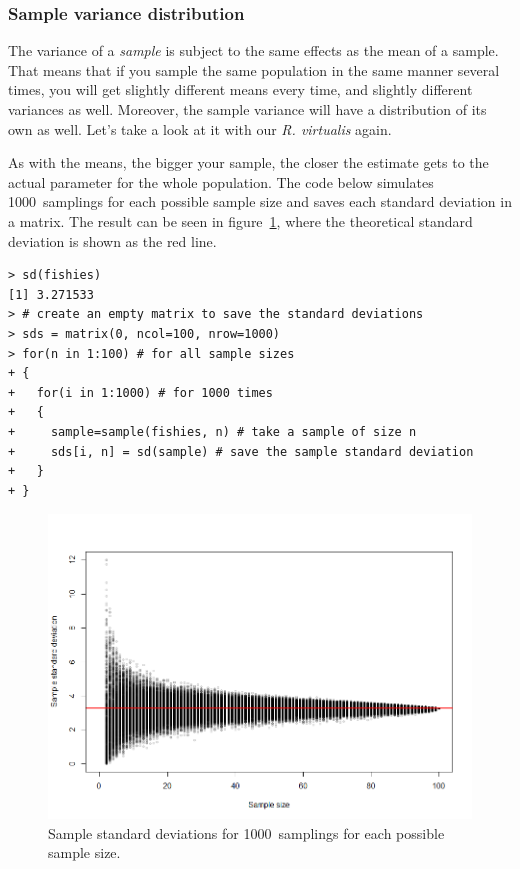 \documentclass{report}
\newcommand{\species}[1]{\textit{#1}}
\begin{document}
			\subsubsection{Sample variance distribution}
			
			The variance of a \emph{sample} is subject to the same effects as the mean of a sample. That means that if you sample the same population in the same manner several times, you will get slightly different means every time, and slightly different variances as well. Moreover, the sample variance will have a distribution of its own as well. Let's take a look at it with our \species{R. virtualis} again.
			
			As with the means, the bigger your sample, the closer the estimate gets to the actual parameter for the whole population. The code below simulates 1000~samplings for each possible sample size and saves each standard deviation in a matrix. The result can be seen in figure~\ref{fig:sds}, where the theoretical standard deviation is shown as the red line.
			
			\begin{verbatim}
> sd(fishies)
[1] 3.271533
> # create an empty matrix to save the standard deviations
> sds = matrix(0, ncol=100, nrow=1000)
> for(n in 1:100) # for all sample sizes
+ {
+   for(i in 1:1000) # for 1000 times
+   {
+     sample=sample(fishies, n) # take a sample of size n
+     sds[i, n] = sd(sample) # save the sample standard deviation
+   }
+ }
			\end{verbatim}
			
			\begin{figure}[h]
				\centering
				\includegraphics[width=1.0\textwidth]{sds.png}
				\caption{Sample standard deviations for 1000~samplings for each possible sample size.}
				\label{fig:sds}
			\end{figure}
			
\end{document}
